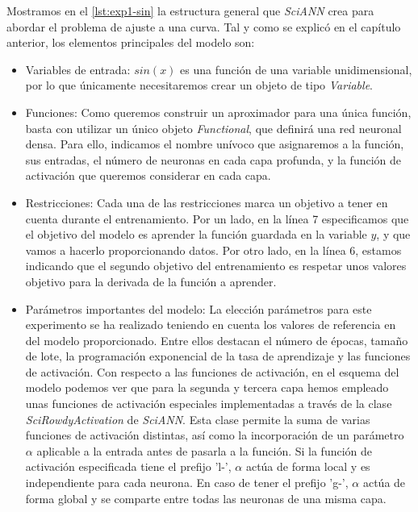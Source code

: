 Mostramos en el \autoref{lst:exp1-sin} la estructura general que \textit{SciANN} crea para abordar el problema de ajuste a una curva. Tal y como se explicó en el capítulo anterior, los elementos principales del modelo son: 
\begin{itemize}
    \item Variables de entrada: $sin(x)$ es una función de una variable unidimensional, por lo que únicamente necesitaremos crear un objeto de tipo \textit{Variable}.
    \item Funciones: Como queremos construir un aproximador para una única función, basta con utilizar un único objeto \textit{Functional}, que definirá una red neuronal densa. Para ello, indicamos el nombre unívoco que asignaremos a la función, sus entradas, el número de neuronas en cada capa profunda, y la función de activación que queremos considerar en cada capa. 
    
    \item Restricciones: Cada una de las restricciones marca un objetivo a tener en cuenta durante el entrenamiento. Por un lado, en la línea 7 especificamos que el objetivo del modelo es aprender la función guardada en la variable $y$, y que vamos a hacerlo proporcionando datos. Por otro lado, en la línea 6,  estamos indicando que el segundo objetivo del entrenamiento es respetar unos valores objetivo para la derivada de la función a aprender.
    \item Parámetros importantes del modelo: La elección parámetros para este experimento se ha realizado teniendo en cuenta los valores de referencia en del modelo proporcionado. Entre ellos destacan el número de épocas, tamaño de lote, la programación exponencial de la tasa de aprendizaje y las funciones de activación. Con respecto a las funciones de activación, en el esquema del modelo podemos ver que para la segunda y tercera capa hemos empleado unas funciones de activación especiales implementadas a través de la clase \textit{SciRowdyActivation} de \textit{SciANN}. Esta clase permite la suma de varias funciones de activación distintas, así como la incorporación de un parámetro $\alpha$ aplicable a la entrada antes de pasarla a la función. Si la función de activación especificada tiene el prefijo 'l-', $\alpha$ actúa de forma local y es independiente para cada neurona. En caso de tener el prefijo 'g-', $\alpha$ actúa de forma global y se comparte entre todas las neuronas de una misma capa. 
\end{itemize}

